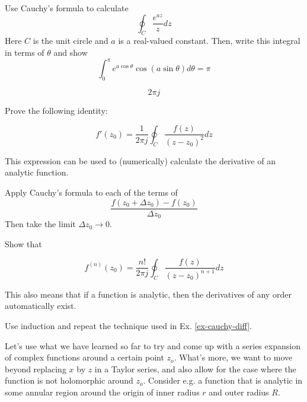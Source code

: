 \begin{exer}
Use Cauchy's formula to calculate 
$$\oint_{{C}}  \frac {e^{az}} {z} dz$$
Here ${C}$ is the unit circle and $a$ is a real-valued constant. Then, write this integral in terms of $\theta$ and show
$$ \int_0^\pi e ^{a \cos \theta} \cos (a \sin \theta) d\theta = \pi $$
\begin{sol}
$$2 \pi j$$
\end{sol}
\end{exer}

\begin{exer}
\label{ex-cauchy-diff}
Prove the following identity:

$$f'(z_0)=\frac{1}{2 \pi j} \oint_{{C}} \frac{f(z)} {(z-z_0)^2} dz$$

This expression can be used to (numerically) calculate the derivative of an analytic function.
\begin{hnt}
Apply Cauchy's formula to each of the terms of $$\frac{f(z_0+\Delta z_0) - f(z_0)}{\Delta z_0}$$ Then take the limit ${\Delta z_0} \to 0$.
\end{hnt}
\end{exer}

\begin{exer}
Show that

  $$f^{(n)}(z_0)=\frac{n!}{2 \pi j} \oint_{{C}} \frac{f(z)} {(z-z_0)^{n+1}} dz$$
  
This also means that if a function is analytic, then the derivatives of any order automatically exist.
\begin{hnt}
Use induction and repeat the technique used in Ex. \ref{ex-cauchy-diff}.
\end{hnt}  
\end{exer}


\pagebreak




Let's use what we have learned so far to try and come up with a series expansion of complex functions around a certain point $z_o$. What's more, we want to move beyond replacing $x$ by $z$ in a Taylor series, and also allow for the case where the function is not holomorphic around $z_o$. Consider e.g. a function that is analytic in some annular region around the origin of inner radius $r$ and outer radius $R$.


